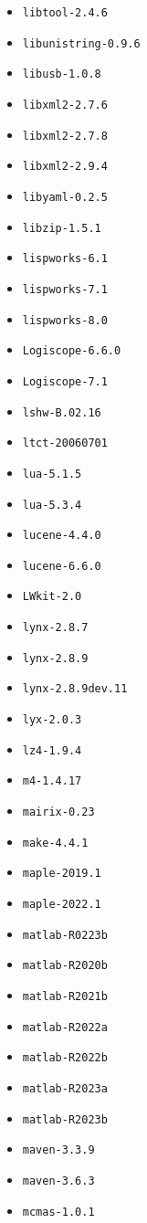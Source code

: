 \begin{itemize}
\item \verb|libtool-2.4.6|
\item \verb|libunistring-0.9.6|
\item \verb|libusb-1.0.8|
\item \verb|libxml2-2.7.6|
\item \verb|libxml2-2.7.8|
\item \verb|libxml2-2.9.4|
\item \verb|libyaml-0.2.5|
\item \verb|libzip-1.5.1|
\item \verb|lispworks-6.1|
\item \verb|lispworks-7.1|
\item \verb|lispworks-8.0|
\item \verb|Logiscope-6.6.0|
\item \verb|Logiscope-7.1|
\item \verb|lshw-B.02.16|
\item \verb|ltct-20060701|
\item \verb|lua-5.1.5|
\item \verb|lua-5.3.4|
\item \verb|lucene-4.4.0|
\item \verb|lucene-6.6.0|
\item \verb|LWkit-2.0|
\item \verb|lynx-2.8.7|
\item \verb|lynx-2.8.9|
\item \verb|lynx-2.8.9dev.11|
\item \verb|lyx-2.0.3|
\item \verb|lz4-1.9.4|
\item \verb|m4-1.4.17|
\item \verb|mairix-0.23|
\item \verb|make-4.4.1|
\item \verb|maple-2019.1|
\item \verb|maple-2022.1|
\item \verb|matlab-R0223b|
\item \verb|matlab-R2020b|
\item \verb|matlab-R2021b|
\item \verb|matlab-R2022a|
\item \verb|matlab-R2022b|
\item \verb|matlab-R2023a|
\item \verb|matlab-R2023b|
\item \verb|maven-3.3.9|
\item \verb|maven-3.6.3|
\item \verb|mcmas-1.0.1|

\end{itemize}
